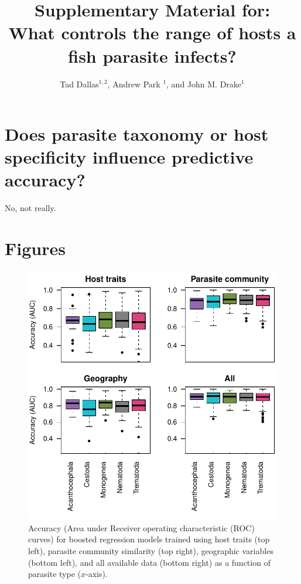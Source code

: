 \documentclass[12pt]{article}
\title{Supplementary Material for: \\
What controls the range of hosts a fish parasite infects?}
\author{Tad Dallas$^{1,2}$, Andrew Park $^{1}$, and John M. Drake$^{1}$}
\begin{document}
 

\maketitle{}

\section{Does parasite taxonomy or host specificity influence predictive accuracy?}

No, not really. 







\section{Figures}
\begin{figure}[h]
  \includegraphics[width=\textwidth]{../Figures/parAccuracy.pdf}
  \caption{Accuracy (Area under Receiver operating characteristic (ROC) curves) for boosted regression models trained using host traits (top left), parasite community similarity (top right), geographic variables (bottom left), and all available data (bottom right) as a function of parasite type ($x$-axis).   }
 \label{fig:parAUC}
 \end{figure}
\end{document}
